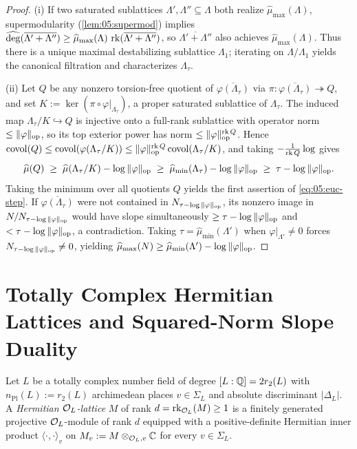 \begin{proof}
(i) If two saturated sublattices $\Lambda', \Lambda'' \subseteq \Lambda$ both realize $\widehat{\mu}_{\max}(\Lambda)$, supermodularity (\cref{lem:05:supermod}) implies $\widehat{\deg}(\overline{\Lambda' + \Lambda''}) \ge \widehat{\mu}_{\max}(\Lambda)\,\operatorname{rk}(\overline{\Lambda' + \Lambda''})$, so $\overline{\Lambda' + \Lambda''}$ also achieves $\widehat{\mu}_{\max}(\Lambda)$. Thus there is a unique maximal destabilizing sublattice $\Lambda_1$; iterating on $\Lambda/\Lambda_1$ yields the canonical filtration and characterizes $\Lambda_\tau$.

(ii) Let $Q$ be any nonzero torsion-free quotient of $\overline{\varphi(\Lambda_\tau)}$ via $\pi : \overline{\varphi(\Lambda_\tau)} \twoheadrightarrow Q$, and set $K := \ker(\pi \circ \varphi|_{\Lambda_\tau})$, a proper saturated sublattice of $\Lambda_\tau$. The induced map $\Lambda_\tau / K \hookrightarrow Q$ is injective onto a full-rank sublattice with operator norm $\le \|\varphi\|_{\mathrm{op}}$, so its top exterior power has norm $\le \|\varphi\|_{\mathrm{op}}^{\operatorname{rk} Q}$. Hence $\operatorname{covol}(Q) \le \operatorname{covol}(\varphi(\Lambda_\tau / K)) \le \|\varphi\|_{\mathrm{op}}^{\operatorname{rk} Q}\operatorname{covol}(\Lambda_\tau / K)$, and taking $-\frac{1}{\operatorname{rk} Q}\log$ gives
\[
  \widehat{\mu}(Q) \;\ge\; \widehat{\mu}(\Lambda_\tau / K) - \log\|\varphi\|_{\mathrm{op}} \;\ge\; \widehat{\mu}_{\min}(\Lambda_\tau) - \log\|\varphi\|_{\mathrm{op}} \;\ge\; \tau - \log\|\varphi\|_{\mathrm{op}}.
\]
Taking the minimum over all quotients $Q$ yields the first assertion of \eqref{eq:05:euc-step}. If $\overline{\varphi(\Lambda_\tau)}$ were not contained in $N_{\tau - \log\|\varphi\|_{\mathrm{op}}}$, its nonzero image in $N / N_{\tau - \log\|\varphi\|_{\mathrm{op}}}$ would have slope simultaneously $\ge \tau - \log\|\varphi\|_{\mathrm{op}}$ and $< \tau - \log\|\varphi\|_{\mathrm{op}}$, a contradiction. Taking $\tau = \widehat{\mu}_{\min}(\Lambda')$ when $\varphi|_{\Lambda'} \neq 0$ forces $N_{\tau - \log\|\varphi\|_{\mathrm{op}}} \neq 0$, yielding $\widehat{\mu}_{\max}(N) \ge \widehat{\mu}_{\min}(\Lambda') - \log\|\varphi\|_{\mathrm{op}}$.
\end{proof}

\section{Totally Complex Hermitian Lattices and Squared-Norm Slope Duality}
\label{sec:05:hermitian-duality}

Let $L$ be a totally complex number field of degree $[L:\mathbb{Q}] = 2 r_2(L)$ with $n_{\mathrm{Pl}}(L) := r_2(L)$ archimedean places $v \in \Sigma_L$ and absolute discriminant $|\Delta_L|$. A \emph{Hermitian $\mathcal{O}_L$-lattice} $M$ of rank $d = \operatorname{rk}_{\mathcal{O}_L}(M) \ge 1$ is a finitely generated projective $\mathcal{O}_L$-module of rank $d$ equipped with a positive-definite Hermitian inner product $\langle \cdot, \cdot \rangle_v$ on $M_v := M \otimes_{\mathcal{O}_L, v} \mathbb{C}$ for every $v \in \Sigma_L$.

